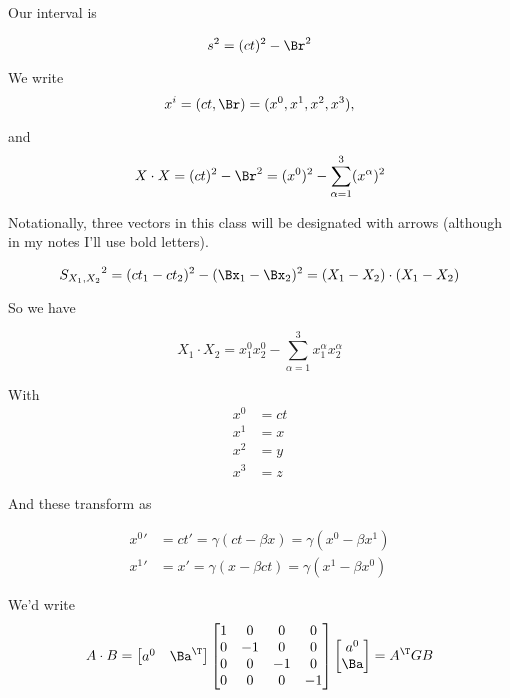 Our interval is 

\begin{equation}\label{eqn:relativisticElectrodynamicsT1:30}
s^2 = (ct)^2 - \Br^2
\end{equation}

We write
\begin{equation}\label{eqn:relativisticElectrodynamicsT1:40}
x^i = (ct, \Br) = (x^0, x^1, x^2, x^3),
\end{equation}

and
\begin{equation}\label{eqn:relativisticElectrodynamicsT1:50}
X \cdot X = (ct)^2 - \Br^2 = (x^0)^2 - \sum_{\alpha=1}^3 (x^\alpha)^2
\end{equation}

Notationally, three vectors in this class will be designated with arrows (although in my notes I'll use bold letters).


\begin{equation}\label{eqn:relativisticElectrodynamicsT1:60}
{S_{X_1, X_2}}^2 = (ct_1 - c t_2)^2 - (\Bx_1 - \Bx_2)^2 = (X_1 - X_2) \cdot (X_1 - X_2)
\end{equation}

So we have

\begin{equation}\label{eqn:relativisticElectrodynamicsT1:70}
X_1 \cdot X_2 = 
x_1^0 x_2^0
- \sum_{\alpha =1}^3 x_1^\alpha x_2^\alpha
\end{equation}

With
\begin{align}\label{eqn:relativisticElectrodynamicsT1:80}
x^0 &= ct \\
x^1 &= x \\
x^2 &= y \\
x^3 &= z 
\end{align}

And these transform as

\begin{align}\label{eqn:relativisticElectrodynamicsT1:90}
{x^0}' &= ct' = \gamma ( ct - \beta x) = \gamma ( x^0 - \beta x^1 ) \\
{x^1}' &= x' = \gamma ( x - \beta ct ) = \gamma ( x^1 - \beta x^0 ) 
\end{align}

We'd write 
\begin{align}\label{eqn:relativisticElectrodynamicsT1:100}
A \cdot B = 
\begin{bmatrix}
a^0 & \Ba^\T 
\end{bmatrix}
\begin{bmatrix}
1 & 0 & 0 & 0 \\
0 & -1 & 0 & 0 \\
0 & 0 & -1 & 0 \\
0 & 0 & 0 & -1 
\end{bmatrix}
\begin{bmatrix}
a^0 \\
\Ba
\end{bmatrix}
= A^\T G B
\end{align}

